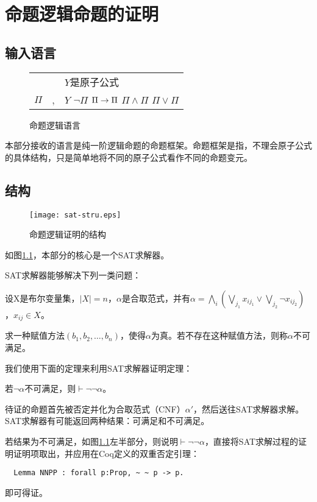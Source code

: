 \chapter{命题逻辑命题的证明}
\label{chap:sat}

\section{输入语言}
\begin{figure}[!htbp]
  \centering
  \begin{tabular}[rcl]{rcl}
    & & $Y$是原子公式 \\
    $\Pi$ & \sep{} & $Y$ \deli{} $\lnot \Pi$ \deli{} $\Pi \rightarrow \Pi$ \deli{} $\Pi \land \Pi$ \deli{} $\Pi \lor \Pi$ \\
  \end{tabular}
  \caption{命题逻辑语言}
\end{figure}
本部分接收的语言是纯一阶逻辑命题的命题框架。命题框架是指，不理会原子公式的具体结构，只是简单地将不同的原子公式看作不同的命题变元。

\section{结构}
\begin{figure}[!htbp]
  \centering
  \texttt{[image: sat-stru.eps]}
  \caption{命题逻辑证明的结构}
  \label{sat:stru}
\end{figure}
如图\ref{sat:stru}，本部分的核心是一个SAT求解器。

SAT求解器能够解决下列一类问题：

\begin{definition}[SAT问题]
设X是布尔变量集，$|X|=n$，$\alpha$是合取范式，并有$\alpha = \bigwedge_i (\bigvee_{j_1} x_{ij_1} \lor \bigvee_{j_2} \lnot x_{ij_2})$，$x_{ij} \in X$。

求一种赋值方法$(b_1, b_2, \dots, b_n)$，使得$\alpha$为真。若不存在这种赋值方法，则称$\alpha$不可满足。
\end{definition}

我们使用下面的定理来利用SAT求解器证明定理：

\begin{theorem}
  若$\lnot \alpha$不可满足，则$\vdash \lnot \lnot \alpha$。
\end{theorem}

待证的命题首先被否定并化为合取范式（CNF）$\alpha'$，然后送往SAT求解器求解。SAT求解器有可能返回两种结果：可满足和不可满足。

若结果为不可满足，如图\ref{sat:stru}左半部分，则说明$\vdash \lnot \lnot \alpha$，直接将SAT求解过程的证明证明项取出，并应用在Coq定义的双重否定引理：
\begin{verbatim}
  Lemma NNPP : forall p:Prop, ~ ~ p -> p.
\end{verbatim}
即可得证。

